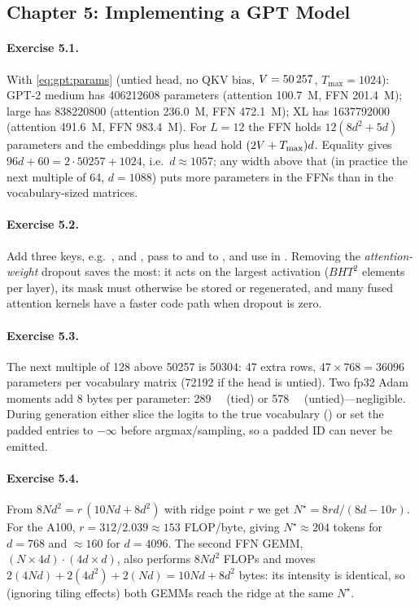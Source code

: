 \subsection*{Chapter 5: Implementing a GPT Model}

\paragraph{Exercise 5.1.}
With \cref{eq:gpt:params} (untied head, no QKV bias, $V=\num{50257}$, $T_\text{max}=1024$):
GPT-2 medium has \num{406212608} parameters (attention \SI{100.7}{M}, FFN \SI{201.4}{M}); large has
\num{838220800} (attention \SI{236.0}{M}, FFN \SI{472.1}{M}); XL has \num{1637792000} (attention
\SI{491.6}{M}, FFN \SI{983.4}{M}). For $L=12$ the FFN holds $12(8d^2+5d)$ parameters and the
embeddings plus head hold $(2V+T_\text{max})d$. Equality gives $96d+60=2\cdot\num{50257}+1024$,
i.e.\ $d\approx1057$; any width above that (in practice the next multiple of 64, $d=1088$) puts more
parameters in the FFNs than in the vocabulary-sized matrices.

\paragraph{Exercise 5.2.}
Add three keys, e.g.\ ,  and , pass
 to  and  to , and
use  in . Removing the \emph{attention-weight} dropout saves the most:
it acts on the largest activation ($BHT^2$ elements per layer), its mask must otherwise be stored or
regenerated, and many fused attention kernels have a faster code path when dropout is zero.

\paragraph{Exercise 5.3.}
The next multiple of 128 above \num{50257} is \num{50304}: 47 extra rows, $47\times768=\num{36096}$
parameters per vocabulary matrix (\num{72192} if the head is untied). Two fp32 Adam moments add
8 bytes per parameter: \SI{289}{\kilo\byte} (tied) or \SI{578}{\kilo\byte} (untied)---negligible.
During generation either slice the logits to the true vocabulary () or set
the padded entries to $-\infty$ before argmax/sampling, so a padded ID can never be emitted.

\paragraph{Exercise 5.4.}
From $8Nd^2=r\,(10Nd+8d^2)$ with ridge point $r$ we get $N^\star=8rd/(8d-10r)$. For the A100,
$r=312/2.039\approx153$ FLOP/byte, giving $N^\star\approx204$ tokens for $d=768$ and $\approx160$ for
$d=4096$. The second FFN GEMM, $(N\times4d)\cdot(4d\times d)$, also performs $8Nd^2$ FLOPs and moves
$2(4Nd)+2(4d^2)+2(Nd)=10Nd+8d^2$ bytes: its intensity is identical, so (ignoring tiling effects) both
GEMMs reach the ridge at the same $N^\star$.


